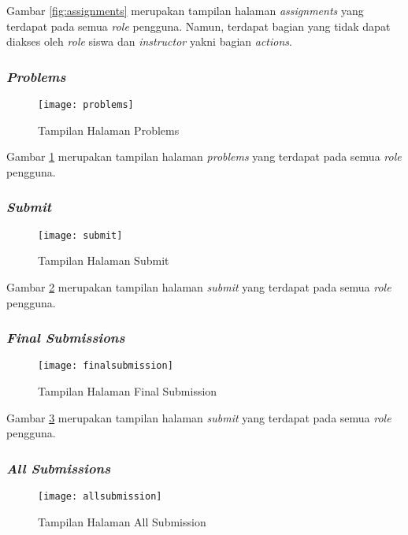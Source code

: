 Gambar \ref{fig:assignments} merupakan tampilan halaman \textit{assignments} yang terdapat pada semua \textit{role} pengguna. Namun, terdapat bagian yang tidak dapat diakses oleh \textit{role} siswa dan \textit{instructor} yakni bagian \textit{actions}.
\subsubsection{\textit{Problems}}
\begin{figure}[H]
	\centering  
	\texttt{[image: problems]}  
	\caption[Tampilan Halaman \textit{Problems}]{Tampilan Halaman Problems} 
	\label{fig:problems} 
\end{figure}

Gambar \ref{fig:problems} merupakan tampilan halaman \textit{problems} yang terdapat pada semua \textit{role} pengguna.

\subsubsection{\textit{Submit}}
\begin{figure}[H]
	\centering  
	\texttt{[image: submit]}  
	\caption[Tampilan Halaman \textit{Submit}]{Tampilan Halaman Submit} 
	\label{fig:submit} 
\end{figure}

Gambar \ref{fig:submit} merupakan tampilan halaman \textit{submit} yang terdapat pada semua \textit{role} pengguna.

\subsubsection{\textit{Final Submissions}}
\begin{figure}[H]
	\centering  
	\texttt{[image: finalsubmission]}  
	\caption[Tampilan Halaman \textit{Final Submission}]{Tampilan Halaman Final Submission} 
	\label{fig:finalsubmission} 
\end{figure}

Gambar \ref{fig:finalsubmission} merupakan tampilan halaman \textit{submit} yang terdapat pada semua \textit{role} pengguna.
\subsubsection{\textit{All Submissions}}
\begin{figure}[H]
	\centering  
	\texttt{[image: allsubmission]}  
	\caption[Tampilan Halaman \textit{All Submission}]{Tampilan Halaman All Submission} 
	\label{fig:allsubmission} 
\end{figure}

